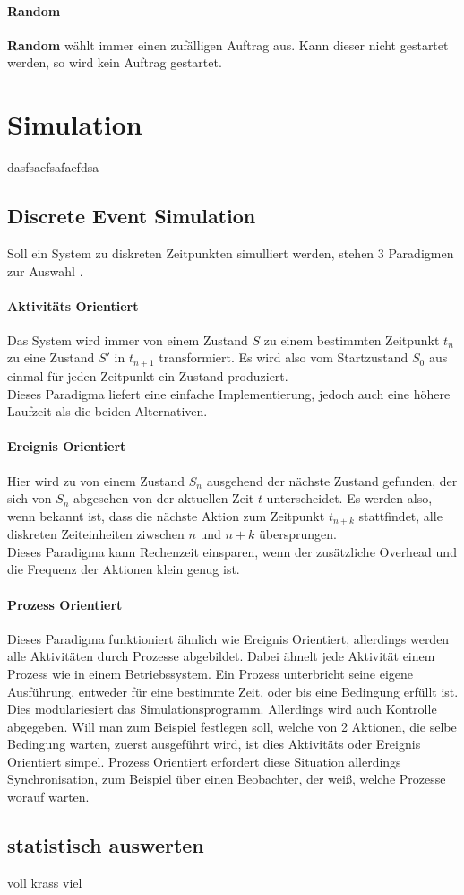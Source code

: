 \paragraph{Random}
\textbf{Random} wählt immer einen zufälligen Auftrag aus. Kann dieser nicht gestartet werden, so wird kein Auftrag gestartet.

\section{Simulation}

dasfsaefsafaefdsa

\subsection{Discrete Event Simulation}
Soll ein System zu diskreten Zeitpunkten simulliert werden, stehen 3 Paradigmen zur Auswahl \cite{SimPy}.
\label{paradigma}
\paragraph{Aktivitäts Orientiert}
\label{activity}
Das System wird immer von einem Zustand $S$ zu einem bestimmten Zeitpunkt $t_n$ zu eine Zustand $S'$ in $t_{n+1}$ transformiert. Es wird also vom Startzustand $S_0$ aus einmal für jeden Zeitpunkt ein Zustand produziert.\\
Dieses Paradigma liefert eine einfache Implementierung, jedoch auch eine höhere Laufzeit als die beiden Alternativen.
\paragraph{Ereignis Orientiert}
Hier wird zu von einem Zustand $S_n$ ausgehend der nächste Zustand gefunden, der sich von $S_n$ abgesehen von der aktuellen Zeit $t$ unterscheidet. Es werden also, wenn bekannt ist, dass die nächste Aktion zum Zeitpunkt $t_{n+k}$ stattfindet, alle diskreten Zeiteinheiten ziwschen $n$ und $n+k$ übersprungen.\\
Dieses Paradigma kann Rechenzeit einsparen, wenn der zusätzliche Overhead und die Frequenz der Aktionen klein genug ist.
\paragraph{Prozess Orientiert}
Dieses Paradigma funktioniert ähnlich wie Ereignis Orientiert, allerdings werden alle Aktivitäten durch Prozesse abgebildet. Dabei ähnelt jede Aktivität einem Prozess wie in einem Betriebssystem. Ein Prozess unterbricht seine eigene Ausführung, entweder für eine bestimmte Zeit, oder bis eine Bedingung erfüllt ist.\\
Dies modulariesiert das Simulationsprogramm. Allerdings wird auch Kontrolle abgegeben. Will man zum Beispiel festlegen soll, welche von 2 Aktionen, die selbe Bedingung warten, zuerst ausgeführt wird, ist dies Aktivitäts oder Ereignis Orientiert simpel. Prozess Orientiert erfordert diese Situation allerdings Synchronisation, zum Beispiel über einen Beobachter, der weiß, welche Prozesse worauf warten.



\subsection{statistisch auswerten}

voll krass viel
